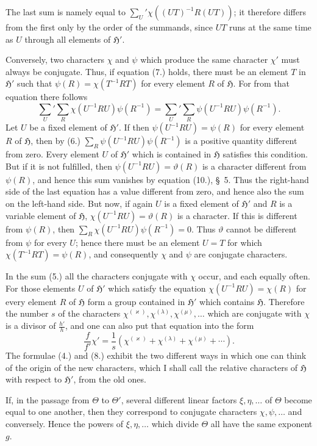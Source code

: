 \documentclass[11pt]{article}
\newcommand{\grp}{\mathfrak{H}}
\begin{document}
The last sum is namely equal to $\sum_U'\chi((UT)^{-1}R(UT))$; it therefore differs from the first only by the order of the summands, since $UT$ runs at the same time as $U$ through all elements of $\grp'$.

Conversely, two characters $\chi$ and $\psi$ which produce the same character $\chi'$ must always be conjugate. Thus, if equation (7.) holds, there must be an element $T$ in $\grp'$ such that $\psi(R)=\chi(T^{-1}RT)$ for every element $R$ of $\grp$. For from that equation there follows
\[
\sum_U'\sum_R \chi(U^{-1}RU)\psi(R^{-1})=\sum_U'\sum_R \psi(U^{-1}RU)\psi(R^{-1}).
\]
Let $U$ be a fixed element of $\grp'$. If then $\psi(U^{-1}RU)=\psi(R)$ for every element $R$ of $\grp$, then by (6.) $\sum_R\psi(U^{-1}RU)\psi(R^{-1})$ is a positive quantity different from zero. Every element $U$ of $\grp'$ which is contained in $\grp$ satisfies this condition. But if it is not fulfilled, then $\psi(U^{-1}RU)=\vartheta(R)$ is a character different from $\psi(R)$, and hence this sum vanishes by equation (10.), \S~5. Thus the right-hand side of the last equation has a value different from zero, and hence also the sum on the left-hand side. But now, if again $U$ is a fixed element of $\grp'$ and $R$ is a variable element of $\grp$, $\chi(U^{-1}RU)=\vartheta(R)$ is a character. If this is different from $\psi(R)$, then $\sum_R\chi(U^{-1}RU)\psi(R^{-1})=0$. Thus $\vartheta$ cannot be different from $\psi$ for every $U$; hence there must be an element $U=T$ for which $\chi(T^{-1}RT)=\psi(R)$, and consequently $\chi$ and $\psi$ are conjugate characters.

In the sum (5.) all the characters conjugate with $\chi$ occur, and each equally often. For those elements $U$ of $\grp'$ which satisfy the equation $\chi(U^{-1}RU)=\chi(R)$ for every element $R$ of $\grp$ form a group contained in $\grp'$ which contains $\grp$. Therefore the number $s$ of the characters $\chi^{(\varkappa)},\chi^{(\lambda)},\chi^{(\mu)},\ldots$ which are conjugate with $\chi$ is a divisor of $\frac{h'}{h}$, and one can also put that equation into the form
\begin{equation*}\tag{8.}
\frac{f}{f'}\chi'=\frac{1}{s}(\chi^{(\varkappa)}+\chi^{(\lambda)}+\chi^{(\mu)}+\cdots).
\end{equation*}
The formulae (4.) and (8.) exhibit the two different ways in which one can think of the origin of the new characters, which I shall call the relative characters of $\grp$ with respect to $\grp'$, from the old ones.

If, in the passage from $\Theta$ to $\Theta'$, several different linear factors $\xi,\eta,\ldots$ of $\Theta$ become equal to one another, then they correspond to conjugate characters $\chi,\psi,\ldots$ and conversely. Hence the powers of $\xi,\eta,\ldots$ which divide $\Theta$ all have the same exponent $g$.
\end{document}
